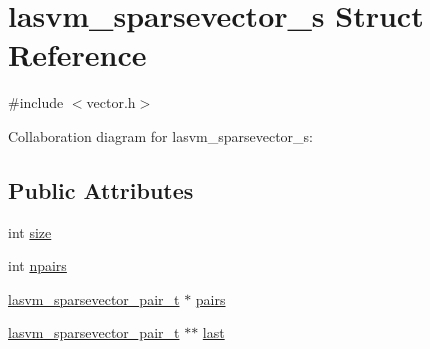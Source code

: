 \hypertarget{structlasvm__sparsevector__s}{\section{lasvm\+\_\+sparsevector\+\_\+s Struct Reference}
\label{structlasvm__sparsevector__s}
}


{\ttfamily \#include $<$vector.\+h$>$}



Collaboration diagram for lasvm\+\_\+sparsevector\+\_\+s\+:
\subsection*{Public Attributes}
\begin{DoxyCompactItemize}
\item 
int \hyperlink{structlasvm__sparsevector__s_a633b9e044c4ff9224d90da03fde45aa2}{size}
\item 
int \hyperlink{structlasvm__sparsevector__s_a2b70154481bf0a7211021f22ee9db98f}{npairs}
\item 
\hyperlink{vector_8h_a28fbf078949b950964adfd08b9115abd}{lasvm\+\_\+sparsevector\+\_\+pair\+\_\+t} $\ast$ \hyperlink{structlasvm__sparsevector__s_aff1ec2417fad6c9f9debe6584de2fe2a}{pairs}
\item 
\hyperlink{vector_8h_a28fbf078949b950964adfd08b9115abd}{lasvm\+\_\+sparsevector\+\_\+pair\+\_\+t} $\ast$$\ast$ \hyperlink{structlasvm__sparsevector__s_ae687376f86369e6aa856e15de71926d9}{last}
\end{DoxyCompactItemize}


